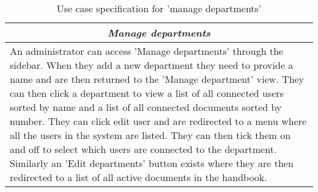 \begin{table}
\centering
\begin{tabular}{p{12cm}}
\hline
\multicolumn{1}{c}{\textit{\textbf{Manage departments}}} \\
\hline
An administrator can access 'Manage departments' through the sidebar.
When they add a new department they need to provide a name and are then returned to the 'Manage department' view.
They can then click a department to view a list of all connected users sorted by name and a list of all connected documents sorted by number.
They can click edit user and are redirected to a menu where all the users in the system are listed.
They can then tick them on and off to select which users are connected to the department.
Similarly an 'Edit departments' button exists where they are then redirected to a list of all active documents in the handbook.
\\\hline
\end{tabular}
\caption{Use case specification for 'manage departments'}\label{tab:Man-Dep-Tab}
\end{table}